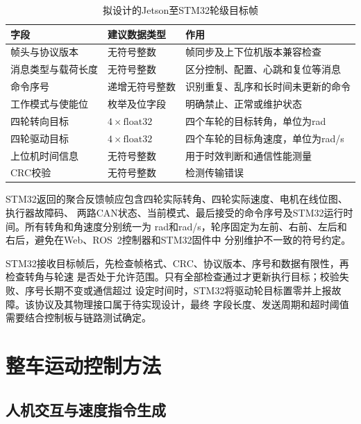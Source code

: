 \documentclass[UTF8,12pt,a4paper,openany]{ctexbook}
\begin{document}
\begin{table}[htbp]
    \centering
    \caption{拟设计的Jetson至STM32轮级目标帧}
    \label{tab:web-command-frame}
    \begin{tabularx}{\textwidth}{p{3.2cm}p{3.0cm}X}
        \toprule
        字段 & 建议数据类型 & 作用 \\
        \midrule
        帧头与协议版本 & 无符号整数 & 帧同步及上下位机版本兼容检查 \\
        消息类型与载荷长度 & 无符号整数 & 区分控制、配置、心跳和复位等消息 \\
        命令序号 & 递增无符号整数 & 识别重复、乱序和长时间未更新的命令 \\
        工作模式与使能位 & 枚举及位字段 & 明确禁止、正常或维护状态 \\
        四轮转向目标 & $4\times\mathrm{float32}$ & 四个车轮的目标转角，单位为rad \\
        四轮驱动目标 & $4\times\mathrm{float32}$ & 四个车轮的目标角速度，单位为rad/s \\
        上位机时间信息 & 无符号整数 & 用于时效判断和通信性能测量 \\
        CRC校验 & 无符号整数 & 检测传输错误 \\
        \bottomrule
    \end{tabularx}
\end{table}

STM32返回的聚合反馈帧应包含四轮实际转角、四轮实际速度、电机在线位图、执行器故障码、
两路CAN状态、当前模式、最后接受的命令序号及STM32运行时间。所有转角和角速度分别统一为
rad和rad/s，轮序固定为左前、右前、左后和右后，避免在Web、ROS~2控制器和STM32固件中
分别维护不一致的符号约定。

STM32接收目标帧后，先检查帧格式、CRC、协议版本、序号和数据有限性，再检查转角与轮速
是否处于允许范围。只有全部检查通过才更新执行目标；校验失败、序号长期不变或通信超过
设定时间时，STM32将驱动轮目标置零并上报故障。该协议及其物理接口属于待实现设计，最终
字段长度、发送周期和超时阈值需要结合控制板与链路测试确定。

\section{整车运动控制方法}

\subsection{人机交互与速度指令生成}
\end{document}
